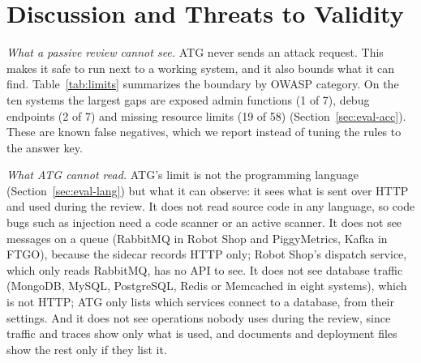 \documentclass[conference]{IEEEtran}
\begin{document}
\section{Discussion and Threats to Validity}\label{sec:discussion}
\textit{What a passive review cannot see.} ATG never sends an attack request. This makes it safe to run next to a working system, and it also bounds what it can find. Table~\ref{tab:limits} summarizes the boundary by OWASP category. On the ten systems the largest gaps are exposed admin functions (1 of 7), debug endpoints (2 of 7) and missing resource limits (19 of 58) (Section~\ref{sec:eval-acc}). These are known false negatives, which we report instead of tuning the rules to the answer key.

\textit{What ATG cannot read.} ATG's limit is not the programming language (Section~\ref{sec:eval-lang}) but what it can observe: it sees what is sent over HTTP and used during the review. It does not read source code in any language, so code bugs such as injection need a code scanner or an active scanner. It does not see messages on a queue (RabbitMQ in Robot Shop and PiggyMetrics, Kafka in FTGO), because the sidecar records HTTP only; Robot Shop's dispatch service, which only reads RabbitMQ, has no API to see. It does not see database traffic (MongoDB, MySQL, PostgreSQL, Redis or Memcached in eight systems), which is not HTTP; ATG only lists which services connect to a database, from their settings. And it does not see operations nobody uses during the review, since traffic and traces show only what is used, and documents and deployment files show the rest only if they list it.
\end{document}

